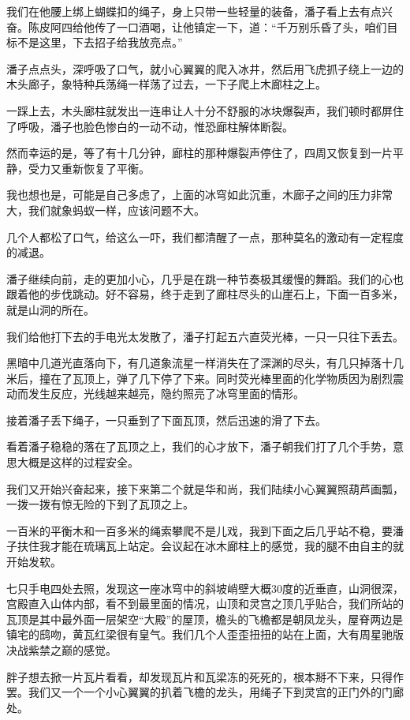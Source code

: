 我们在他腰上绑上蝴蝶扣的绳子，身上只带一些轻量的装备，潘子看上去有点兴奋。陈皮阿四给他传了一口酒喝，让他镇定一下，道：“千万别乐昏了头，咱们目标不是这里，下去招子给我放亮点。”

潘子点点头，深呼吸了口气，就小心翼翼的爬入冰井，然后用飞虎抓子绕上一边的木头廊子，象特种兵荡绳一样荡了过去，一下子爬上木廊柱之上。

一踩上去，木头廊柱就发出一连串让人十分不舒服的冰块爆裂声，我们顿时都屏住了呼吸，潘子也脸色惨白的一动不动，惟恐廊柱解体断裂。

然而幸运的是，等了有十几分钟，廊柱的那种爆裂声停住了，四周又恢复到一片平静，受力又重新恢复了平衡。

我也想也是，可能是自己多虑了，上面的冰穹如此沉重，木廊子之间的压力非常大，我们就象蚂蚁一样，应该问题不大。

几个人都松了口气，给这么一吓，我们都清醒了一点，那种莫名的激动有一定程度的减退。

潘子继续向前，走的更加小心，几乎是在跳一种节奏极其缓慢的舞蹈。我们的心也跟着他的步伐跳动。好不容易，终于走到了廊柱尽头的山崖石上，下面一百多米，就是山洞的所在。

我们给他打下去的手电光太发散了，潘子打起五六直荧光棒，一只一只往下丢去。

黑暗中几道光直落向下，有几道象流星一样消失在了深渊的尽头，有几只掉落十几米后，撞在了瓦顶上，弹了几下停了下来。同时荧光棒里面的化学物质因为剧烈震动而发生反应，光线越来越亮，隐约照亮了冰穹里面的情形。

接着潘子丢下绳子，一只垂到了下面瓦顶，然后迅速的滑了下去。

看着潘子稳稳的落在了瓦顶之上，我们的心才放下，潘子朝我们打了几个手势，意思大概是这样的过程安全。

我们又开始兴奋起来，接下来第二个就是华和尚，我们陆续小心翼翼照葫芦画瓢，一拨一拨有惊无险的下到了瓦顶之上。

一百米的平衡木和一百多米的绳索攀爬不是儿戏，我到下面之后几乎站不稳，要潘子扶住我才能在琉璃瓦上站定。会议起在冰木廊柱上的感觉，我的腿不由自主的就开始发软。

七只手电四处去照，发现这一座冰穹中的斜坡峭壁大概30度的近垂直，山洞很深，宫殿直入山体内部，看不到最里面的情况，山顶和灵宫之顶几乎贴合，我们所站的瓦顶是其中最外面一层架空“大殿”的屋顶，檐头的飞檐都是朝凤龙头，屋脊两边是镇宅的鸱吻，黄瓦红梁很有皇气。我们几个人歪歪扭扭的站在上面，大有周星驰版决战紫禁之巅的感觉。

胖子想去掀一片瓦片看看，却发现瓦片和瓦梁冻的死死的，根本掰不下来，只得作罢。我们又一个一个小心翼翼的扒着飞檐的龙头，用绳子下到灵宫的正门外的门廊处。


